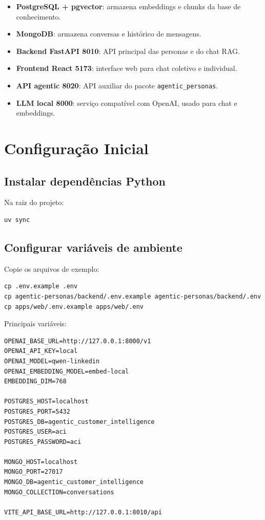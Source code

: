 \documentclass[12pt,a4paper]{article}
\begin{document}
\begin{itemize}
  \item \textbf{PostgreSQL + pgvector}: armazena embeddings e chunks da base de conhecimento.
  \item \textbf{MongoDB}: armazena conversas e histórico de mensagens.
  \item \textbf{Backend FastAPI 8010}: API principal das personas e do chat RAG.
  \item \textbf{Frontend React 5173}: interface web para chat coletivo e individual.
  \item \textbf{API agentic 8020}: API auxiliar do pacote \texttt{agentic\_personas}.
  \item \textbf{LLM local 8000}: serviço compatível com OpenAI, usado para chat e embeddings.
\end{itemize}

\section{Configuração Inicial}

\subsection{Instalar dependências Python}

Na raiz do projeto:

\begin{verbatim}
uv sync
\end{verbatim}

\subsection{Configurar variáveis de ambiente}

Copie os arquivos de exemplo:

\begin{verbatim}
cp .env.example .env
cp agentic-personas/backend/.env.example agentic-personas/backend/.env
cp apps/web/.env.example apps/web/.env
\end{verbatim}

Principais variáveis:

\begin{verbatim}
OPENAI_BASE_URL=http://127.0.0.1:8000/v1
OPENAI_API_KEY=local
OPENAI_MODEL=qwen-linkedin
OPENAI_EMBEDDING_MODEL=embed-local
EMBEDDING_DIM=768

POSTGRES_HOST=localhost
POSTGRES_PORT=5432
POSTGRES_DB=agentic_customer_intelligence
POSTGRES_USER=aci
POSTGRES_PASSWORD=aci

MONGO_HOST=localhost
MONGO_PORT=27017
MONGO_DB=agentic_customer_intelligence
MONGO_COLLECTION=conversations

VITE_API_BASE_URL=http://127.0.0.1:8010/api
\end{verbatim}
\end{document}
